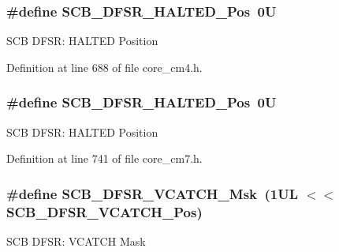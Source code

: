 \subsubsection[{\texorpdfstring{S\+C\+B\+\_\+\+D\+F\+S\+R\+\_\+\+H\+A\+L\+T\+E\+D\+\_\+\+Pos}{SCB_DFSR_HALTED_Pos}}]{\setlength{\rightskip}{0pt plus 5cm}\#define S\+C\+B\+\_\+\+D\+F\+S\+R\+\_\+\+H\+A\+L\+T\+E\+D\+\_\+\+Pos~0U}\hypertarget{group___c_m_s_i_s___s_c_b_gaef4ec28427f9f88ac70a13ae4e541378}{}\label{group___c_m_s_i_s___s_c_b_gaef4ec28427f9f88ac70a13ae4e541378}
S\+CB D\+F\+SR\+: H\+A\+L\+T\+ED Position 

Definition at line 688 of file core\+\_\+cm4.\+h.

\subsubsection[{\texorpdfstring{S\+C\+B\+\_\+\+D\+F\+S\+R\+\_\+\+H\+A\+L\+T\+E\+D\+\_\+\+Pos}{SCB_DFSR_HALTED_Pos}}]{\setlength{\rightskip}{0pt plus 5cm}\#define S\+C\+B\+\_\+\+D\+F\+S\+R\+\_\+\+H\+A\+L\+T\+E\+D\+\_\+\+Pos~0U}\hypertarget{group___c_m_s_i_s___s_c_b_gaef4ec28427f9f88ac70a13ae4e541378}{}\label{group___c_m_s_i_s___s_c_b_gaef4ec28427f9f88ac70a13ae4e541378}
S\+CB D\+F\+SR\+: H\+A\+L\+T\+ED Position 

Definition at line 741 of file core\+\_\+cm7.\+h.

\subsubsection[{\texorpdfstring{S\+C\+B\+\_\+\+D\+F\+S\+R\+\_\+\+V\+C\+A\+T\+C\+H\+\_\+\+Msk}{SCB_DFSR_VCATCH_Msk}}]{\setlength{\rightskip}{0pt plus 5cm}\#define S\+C\+B\+\_\+\+D\+F\+S\+R\+\_\+\+V\+C\+A\+T\+C\+H\+\_\+\+Msk~(1\+U\+L $<$$<$ S\+C\+B\+\_\+\+D\+F\+S\+R\+\_\+\+V\+C\+A\+T\+C\+H\+\_\+\+Pos)}\hypertarget{group___c_m_s_i_s___s_c_b_gacbb931575c07b324ec793775b7c44d05}{}\label{group___c_m_s_i_s___s_c_b_gacbb931575c07b324ec793775b7c44d05}
S\+CB D\+F\+SR\+: V\+C\+A\+T\+CH Mask 

